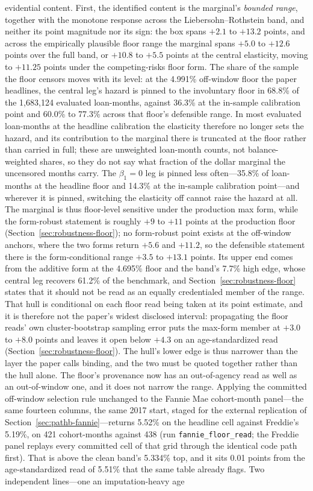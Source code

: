 \documentclass[12pt]{article}
\begin{document}
evidential content. First, the identified content is the marginal's \emph{bounded range}, together with the monotone response across the Liebersohn--Rothstein band, and neither its point magnitude nor its sign: the box spans $+2.1$ to $+13.2$ points, and across the empirically plausible floor range the marginal spans $+5.0$ to $+12.6$ points over the full band, or $+10.8$ to $+5.5$ points at the central elasticity, moving to $+11.25$ points under the competing-risks floor form. The share of the sample the floor censors moves with its level: at the 4.991\% off-window floor the paper headlines, the central leg's hazard is pinned to the involuntary floor in 68.8\% of the 1,683,124 evaluated loan-months, against 36.3\% at the in-sample calibration point and 60.0\% to 77.3\% across that floor's defensible range. In most evaluated loan-months at the headline calibration the elasticity therefore no longer sets the hazard, and its contribution to the marginal there is truncated at the floor rather than carried in full; these are unweighted loan-month counts, not balance-weighted shares, so they do not say what fraction of the dollar marginal the uncensored months carry. The $\beta_1 = 0$ leg is pinned less often---35.8\% of loan-months at the headline floor and 14.3\% at the in-sample calibration point---and wherever it is pinned, switching the elasticity off cannot raise the hazard at all. The marginal is thus floor-level sensitive under the production max form, while the form-robust statement is roughly $+9$ to $+11$ points at the production floor (Section~\ref{sec:robustness-floor}); no form-robust point exists at the off-window anchors, where the two forms return $+5.6$ and $+11.2$, so the defensible statement there is the form-conditional range $+3.5$ to $+13.1$ points. Its upper end comes from the additive form at the 4.695\% floor and the band's 7.7\% high edge, whose central leg recovers 61.2\% of the benchmark, and Section~\ref{sec:robustness-floor} states that it should not be read as an equally credentialed member of the range. That hull is conditional on each floor read being taken at its point estimate, and it is therefore not the paper's widest disclosed interval: propagating the floor reads' own cluster-bootstrap sampling error puts the max-form member at $+3.0$ to $+8.0$ points and leaves it open below $+4.3$ on an age-standardized read (Section~\ref{sec:robustness-floor}). The hull's lower edge is thus narrower than the layer the paper calls binding, and the two must be quoted together rather than the hull alone. The floor's provenance now has an out-of-agency read as well as an out-of-window one, and it does not narrow the range. Applying the committed off-window selection rule unchanged to the Fannie Mae cohort-month panel---the same fourteen columns, the same 2017 start, staged for the external replication of Section~\ref{sec:pathb-fannie}---returns 5.52\% on the headline cell against Freddie's 5.19\%, on 421 cohort-months against 438 (run \texttt{fannie\_floor\_read}; the Freddie panel replays every committed cell of that grid through the identical code path first). That is above the clean band's 5.334\% top, and it sits 0.01 points from the age-standardized read of 5.51\% that the same table already flags. Two independent lines---one an imputation-heavy age 
\end{document}
